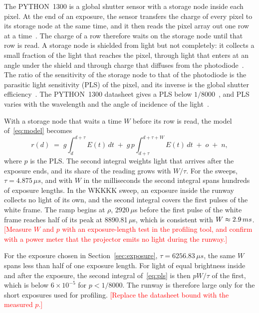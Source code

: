 \documentclass[10pt,journal,compsoc]{IEEEtran}
\newcommand{\SI}[2]{#1\,#2}
\newcommand{\micro}{\ensuremath{\mu}}
\newcommand{\second}{s}\newcommand{\hertz}{Hz}\newcommand{\metre}{m}
\newcommand{\pending}[1]{\textcolor{red}{[#1]}}
\begin{document}
The PYTHON~1300 is a global shutter sensor with a storage node inside each pixel. At the end of
an exposure, the sensor transfers the charge of every pixel to its storage node at the same
time, and it then reads the pixel array out one row at a time~\cite{onsemi_python1300}. The
charge of a row therefore waits on the storage node until that row is read. A storage node is
shielded from light but not completely: it collects a small fraction of the light that reaches
the pixel, through light that enters at an angle under the shield and through charge that
diffuses from the photodiode~\cite{meynants2013global,yokoyama2018pls}. The ratio of the
sensitivity of the storage node to that of the photodiode is the parasitic light sensitivity
(PLS) of the pixel, and its inverse is the global shutter
efficiency~\cite{yokoyama2018pls,meynants2013global}. The PYTHON~1300 datasheet gives a PLS below
$1/8000$~\cite{onsemi_python1300}, and PLS varies with the wavelength and the angle of incidence
of the light~\cite{theuwissen2022pls}.

With a storage node that waits a time $W$ before its row is read, the model
of~\eqref{eq:model} becomes
\begin{equation}
r(d) \;=\; g\!\int_{d}^{d+\tau}\! E(t)\,dt \;+\; g\,p\!\int_{d+\tau}^{d+\tau+W}\! E(t)\,dt
\;+\; o \;+\; n,
\label{eq:pls}
\end{equation}
where $p$ is the PLS. The second integral weights light that arrives after the exposure ends,
and its share of the reading grows with $W/\tau$. For the sweeps, $\tau=\SI{4.875}{\micro\second}$,
and with $W$ in the milliseconds the second integral spans hundreds of exposure lengths. In the
WKKKK sweep, an exposure inside the runway collects no light of its own, and the second integral
covers the first pulses of the white frame. The ramp begins at $\rho$, \SI{2920}{\micro\second}
before the first pulse of the white frame reaches half of its peak at \SI{8890.81}{\micro\second},
which is consistent with $W\approx\SI{2.9}{\milli\second}$. \pending{Measure $W$ and $p$ with an
exposure-length test in the profiling tool, and confirm with a power meter that the projector
emits no light during the runway.}

For the exposure chosen in Section~\ref{sec:exposure}, $\tau=\SI{6256.83}{\micro\second}$, the
same $W$ spans less than half of one exposure length. For light of equal brightness inside and
after the exposure, the second integral of~\eqref{eq:pls} is then $pW/\tau$ of the first, which is
below $6\times10^{-5}$ for $p<1/8000$. The runway is therefore large only for the short exposures
used for profiling. \pending{Replace the datasheet bound with the measured $p$.}
\end{document}
